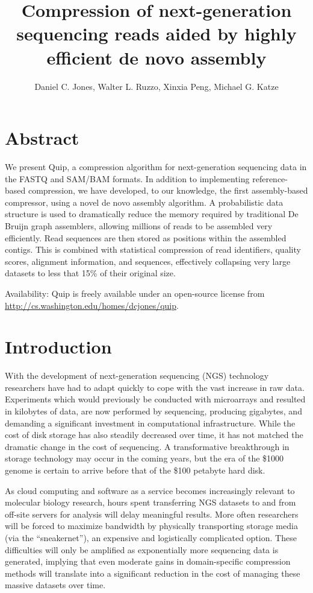 \documentclass[twocolumn]{article}
\title{Compression of next-generation sequencing reads aided by highly efficient de novo assembly}
\author{Daniel C. Jones, Walter L. Ruzzo, Xinxia Peng, Michael G. Katze}
\begin{document}
\maketitle

\section{Abstract}

We present Quip, a compression algorithm for next-generation sequencing data
in the FASTQ and SAM/BAM formats. In addition to implementing reference-based
compression, we have developed, to our knowledge, the first assembly-based
compressor, using a novel de novo assembly algorithm. A probabilistic data
structure is used to dramatically reduce the memory required by traditional De
Bruijn graph assemblers, allowing millions of reads to be assembled very
efficiently. Read sequences are then stored as positions within the assembled
contigs. This is combined with statistical compression of read identifiers,
quality scores, alignment information, and sequences, effectively collapsing
very large datasets to less that 15\% of their original size.

Availability: Quip is freely available under an open-source license from
\url{http://cs.washington.edu/homes/dcjones/quip}.

\section{Introduction}

With the development of next-generation sequencing (NGS) technology
researchers have had to adapt quickly to cope with the vast increase in raw
data. Experiments which would previously be conducted with microarrays and
resulted in kilobytes of data, are now performed by sequencing, producing
gigabytes, and demanding a significant investment in computational
infrastructure. While the cost of disk storage has also steadily decreased
over time, it has not matched the dramatic change in the cost of sequencing.
A transformative breakthrough in storage technology may occur in the coming
years, but the era of the \$1000 genome is certain to arrive before that of
the \$100 petabyte hard disk.

As cloud computing and software as a service becomes increasingly
relevant to molecular biology research, hours spent transferring NGS datasets
to and from off-site servers for analysis will delay meaningful results. More
often researchers will be forced to maximize bandwidth by physically
transporting storage media (via the ``sneakernet''), an expensive and
logistically complicated option. These difficulties will only be amplified as
exponentially more sequencing data is generated,  implying that even moderate
gains in domain-specific compression methods will translate into a significant
reduction in the cost of managing these massive datasets over time.
\end{document}
